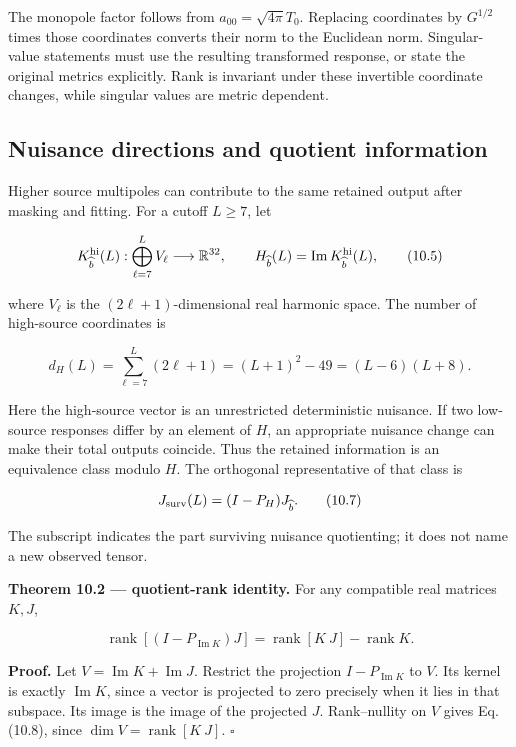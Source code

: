 \documentclass[
  11pt,
  a4paper]{article}
\begin{document}
The monopole factor follows from \(a_{00}=\sqrt{4\pi}T_0\). Replacing coordinates by \(G^{1/2}\) times those coordinates converts their norm to the Euclidean norm. Singular-value statements must use the resulting transformed response, or state the original metrics explicitly. Rank is invariant under these invertible coordinate changes, while singular values are metric dependent.

\hypertarget{nuisance-directions-and-quotient-information}{%
\subsection{Nuisance directions and quotient information}\label{nuisance-directions-and-quotient-information}}

Higher source multipoles can contribute to the same retained output after masking and fitting. For a cutoff \(L\ge7\), let

\[
K_{\widehat b}^{\rm hi}(L):
\bigoplus_{\ell=7}^{L}V_\ell\longrightarrow\mathbb R^{32},
\qquad
H_{\widehat b}(L)=\operatorname{Im}K_{\widehat b}^{\rm hi}(L),
\tag{10.5}
\]

where \(V_\ell\) is the \((2\ell+1)\)-dimensional real harmonic space. The number of high-source coordinates is

\[
d_H(L)=\sum_{\ell=7}^{L}(2\ell+1)
=(L+1)^2-49=(L-6)(L+8).
\tag{10.6}
\]

Here the high-source vector is an unrestricted deterministic nuisance. If two low-source responses differ by an element of \(H\), an appropriate nuisance change can make their total outputs coincide. Thus the retained information is an equivalence class modulo \(H\). The orthogonal representative of that class is

\[
J_{\rm surv}(L)=(I-P_H)J_{\widehat b}.
\tag{10.7}
\]

The subscript indicates the part surviving nuisance quotienting; it does not name a new observed tensor.

\textbf{Theorem 10.2 --- quotient-rank identity.} For any compatible real matrices \(K,J\),

\[
\boxed{\operatorname{rank}[(I-P_{\operatorname{Im}K})J]
=\operatorname{rank}[K\ J]-\operatorname{rank}K.}
\tag{10.8}
\]

\textbf{Proof.} Let \(V=\operatorname{Im}K+\operatorname{Im}J\). Restrict the projection \(I-P_{\operatorname{Im}K}\) to \(V\). Its kernel is exactly \(\operatorname{Im}K\), since a vector is projected to zero precisely when it lies in that subspace. Its image is the image of the projected \(J\). Rank--nullity on \(V\) gives Eq. (10.8), since \(\dim V=\operatorname{rank}[K\ J]\). \(\square\)
\end{document}
